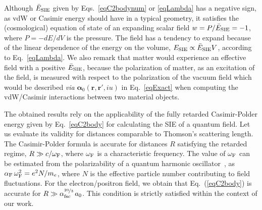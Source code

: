 \documentclass[aps,prl,twocolumn,showpacs,groupaddress]{revtex4-1}
\newcommand{\via}{\emph{via }}
\newcommand{\bbb}[1]{{\color{black}#1}}
\begin{document}
Although $\bar{E}_{\rm{SIE}}$ given by Eqs.~\eqref{eqC2bodynum} or \eqref{eqLambda} has a negative sign, as vdW or Casimir energy should have in a typical geometry, it satisfies the (cosmological) equation of state of an expanding scalar 
field $w = P/\bar{E}_{\rm{SIE}}= -1$, where $P=-dE/dV$ is the pressure. The field has a tendency to expand because of 
\bbb{the linear} dependence of the energy on the volume,
$E_{\rm{SIE}} \propto \bar{E}_{\rm{SIE}} V$,
according to Eq.~\eqref{eqLambda}.
We also remark that matter would experience an effective field with a positive $\bar{E}_{\rm{SIE}}$, because the polarization of matter, as an excitation of the field, is measured with respect to the polarization of the vacuum field which would be described \via ${\bm{\alpha}}_0(\mathbf{r},\mathbf{r}',iu)$ in Eq.~\eqref{eqExact} when computing the vdW/Casimir interactions between two material objects. 

The obtained results rely on \bbb{the applicability of the fully retarded Casimir-Polder energy given by Eq.~\eqref{eqC2body}} for calculating the SIE of a quantum field.
\bbb{Let us evaluate its validity for} distances
comparable to Thomson's scattering length. 
The \bbb{Casimir-Polder} formula is accurate for distances $R$ satisfying
\bbb{the retarded regime,}
$R \gg c/ \omega_{\rm F}$, where $\omega_{\rm F}$ is a characteristic frequency. The value of $\omega_{\rm F}$ can be estimated %
from \bbb{the polarizability of a quantum harmonic oscillator~\cite{Jan-ChemRev}, as}
$\alpha_{\rm F}\, \omega_{\rm F}^2 = e^2 N/m_e$,
where $N$ is the effective particle number contributing to field fluctuations. For the electron/positron field, we obtain that Eq.~(\ref{eqC2body}) is accurate for $R \gg \alpha_{\rm fsc}^{\nicefrac{20}{3}}\, a_0$. This condition is strictly satisfied within the context of our work.   
\end{document}
